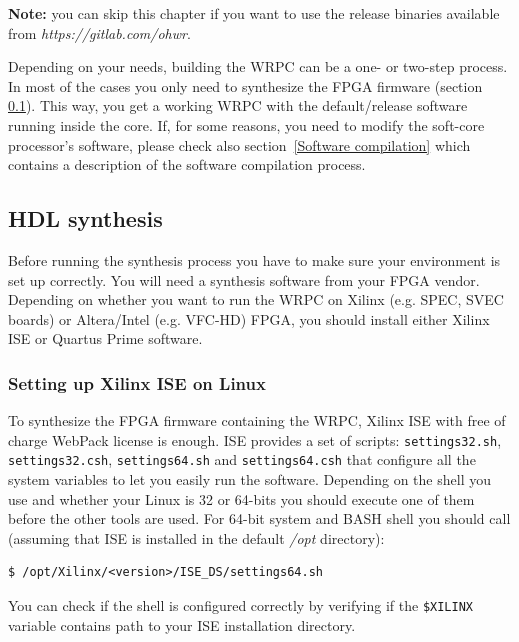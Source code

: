 \documentclass[a4paper, 12pt]{article}
\renewcommand{\_}{\underscore\allowbreak}
\begin{document}
\textbf{Note:} you can skip this chapter if you want to use the release binaries
available from \textit{https://gitlab.com/ohwr}.

\vspace{1em}
Depending on your needs, building the WRPC can be a one- or two-step process.
In most of the cases you only need to synthesize the FPGA firmware (section
\ref{HDL synthesis}). This way, you get a working WRPC with the default/release
software running inside the core. If, for some reasons, you need to modify
the soft-core processor's software, please check also
section~\ref{Software compilation}
which contains a description of the software compilation process.

\subsection{HDL synthesis}
\label{HDL synthesis}

Before running the synthesis process you have to make sure your environment is
set up correctly. You will need a synthesis software from your FPGA vendor.
Depending on whether you want to run the WRPC on Xilinx (e.g. SPEC, SVEC boards) or
Altera/Intel (e.g. VFC-HD) FPGA, you should install either Xilinx ISE or Quartus
Prime software.

\subsubsection{Setting up Xilinx ISE on Linux}
\label{Setting up Xilinx ISE}
To synthesize the FPGA firmware containing the WRPC, Xilinx ISE with free of
charge WebPack license is enough. ISE provides a set of scripts:
\texttt{settings32.sh}, \texttt{settings32.csh}, \texttt{settings64.sh} and
\texttt{settings64.csh} that configure all the system variables to let you
easily run the software. Depending on the shell you use and whether your Linux is
32 or 64-bits you should execute one of them before the other tools are used.
For 64-bit system and BASH shell you should call (assuming that ISE is installed
in the default \textit{/opt} directory):
\begin{lstlisting}
$ /opt/Xilinx/<version>/ISE_DS/settings64.sh
\end{lstlisting}

You can check if the shell is configured correctly by verifying if the
\texttt{\$XILINX} variable contains path to your ISE installation directory.
\end{document}
